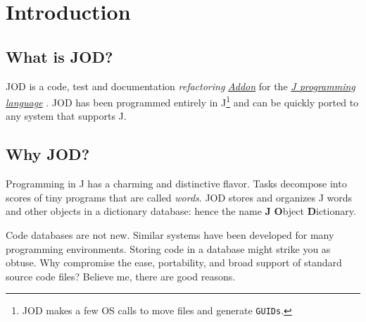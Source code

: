    \section{Introduction}
   
   \subsection{What is JOD?}
   
   JOD is a code, test and documentation \emph{refactoring} \href{https://www.jsoftware.com/jwiki/Addons}{\emph{Addon}} for the
     \href{https://www.jsoftware.com}{\emph{J programming language}} \cite{RKWHui:jdictionary} \cite{jwiki:nuvoc}. JOD has been 
      programmed entirely in J\footnote{JOD makes a few OS calls to move files and generate \texttt{GUIDs}.}
      and can be quickly ported to any system that supports J.
   
   \subsection{Why JOD?}  
   
   Programming in J 
   has a charming and distinctive flavor.  Tasks decompose into scores of tiny
   programs that are called \emph{words}. JOD stores and organizes
   J words and other objects in a dictionary database: hence the 
   name \textbf{J} \textbf{O}bject \textbf{D}ictionary.
   
   Code  databases are not new.  Similar systems have 
   been developed for many programming
   environments. Storing code in a database might strike you as obtuse.  
   Why compromise the ease, portability, and broad support of standard source code  
   files? Believe me,
   there are good reasons.
   
